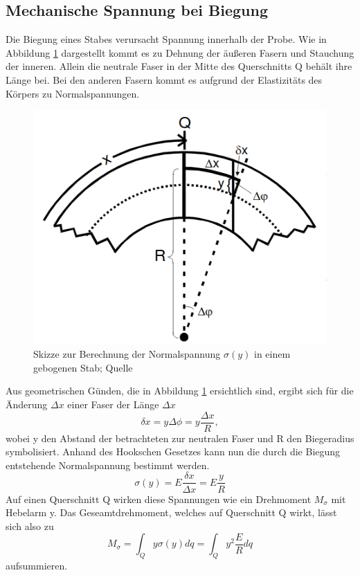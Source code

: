 \subsection{Mechanische Spannung bei Biegung}
    \label{sec:aiaiai}
    Die Biegung eines Stabes verursacht Spannung innerhalb der Probe. Wie in Abbildung \ref{fig:backfisch}
    dargestellt kommt es zu Dehnung der äußeren Fasern und Stauchung der inneren. 
    Allein die neutrale Faser in der Mitte des Querschnitts Q behält ihre Länge bei.
    Bei den anderen Fasern kommt es aufgrund der Elastizitäts des Körpers zu Normalspannungen.
    \begin{figure}
        \centering
        \includegraphics[scale=0.5]{Backfisch.png}
        \caption{Skizze zur Berechnung der Normalspannung $\sigma(y)$ in einem gebogenen Stab; Quelle \cite{sample}}
        \label{fig:backfisch}
    \end{figure}
    Aus geometrischen Günden, die in Abbildung \ref{fig:backfisch} ersichtlich sind, 
    ergibt sich für die Änderung $\Delta x$ einer Faser der Länge $\Delta x$
    \begin{equation*}
        \delta x = y \Delta \phi= y\dfrac{\Delta x}{R},
    \end{equation*}
    wobei y den Abstand der betrachteten zur neutralen Faser und R den Biegeradius
    symbolisiert. Anhand des Hookschen Gesetzes kann nun die durch die Biegung 
    entstehende Normalspannung bestimmt werden.
    \begin{equation*}
        \sigma(y)=E\dfrac{\delta x}{\Delta x}=E \dfrac{y}{R}
    \end{equation*}
    Auf einen Querschnitt Q wirken diese Spannungen wie ein Drehmoment $M_{\sigma}$ mit
    Hebelarm y. Das Geseamtdrehmoment, welches auf Querschnitt Q wirkt, lässt sich also 
    zu
    \begin{equation}
        \label{eqn:fuckyou}
        M_{\sigma}=\int_Q y \sigma(y)dq = \int_Q y^2 \dfrac{E}{R}dq 
    \end{equation}
    aufsummieren. 
    
